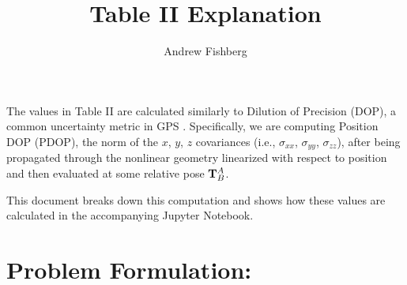 \documentclass[12pt,letterpaper]{article}
\title{Table II Explanation}
\author{Andrew Fishberg}
\date{}
\begin{document}
\maketitle

The values in Table II are calculated similarly to Dilution of Precision (DOP), a common uncertainty metric in GPS \cite{langley1999dilution}. Specifically, we are computing Position DOP (PDOP), the norm of the $x$, $y$, $z$ covariances (i.e., $\sigma_{xx}$, $\sigma_{yy}$, $\sigma_{zz}$), after being propagated through the nonlinear geometry linearized with respect to position and then evaluated at some relative pose $\mathbf{T}^{A}_{B}$.

This document breaks down this computation and shows how these values are calculated in the accompanying Jupyter Notebook.

\section{Problem Formulation:}
\end{document}
